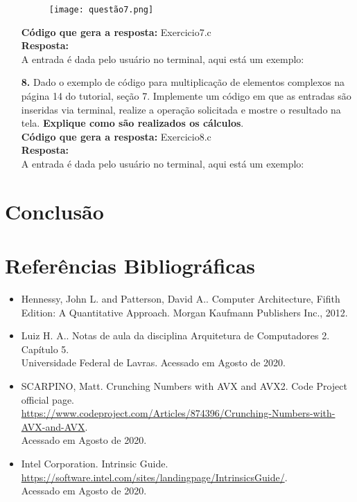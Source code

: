 \documentclass[oneside,a4paper,12pt]{article}
\renewcommand{\b}{\textbf}
\begin{document}
\begin{enumerate}
    \begin{figure}[H]
    \centering
    \texttt{[image: questão7.png]}
    \label{fig:Figura1}
    \end{figure}
   
   \b{Código que gera a resposta:} Exercicio7.c\\
   \b{Resposta:}\\
    A entrada é dada pelo usuário no terminal, aqui está um exemplo:\\
   
   \item[\b{8.}] Dado o exemplo de código para multiplicação de elementos complexos na página 14 do tutorial, seção 7. Implemente um código em que as entradas são inseridas via terminal, realize a operação solicitada e mostre o resultado na tela. \b{Explique como são realizados os cálculos}.\\
   
   \b{Código que gera a resposta:} Exercicio8.c\\
   \b{Resposta:}\\
    A entrada é dada pelo usuário no terminal, aqui está um exemplo:\\
   
\end{enumerate}

\section{Conclusão}
\onehalfspacing


\section{Referências Bibliográficas}

\begin{itemize}
    \item Hennessy, John L. and Patterson, David A.. Computer Architecture, Fifith Edition: A Quantitative Approach. Morgan Kaufmann Publishers Inc., 2012.
    
    \item Luiz H. A.. Notas de aula da disciplina Arquitetura de Computadores 2. Capítulo 5.\\
    Universidade Federal de Lavras. Acessado em Agosto de 2020.

    \item SCARPINO, Matt. Crunching Numbers with AVX and AVX2. Code Project official page.\\
    \url{https://www.codeproject.com/Articles/874396/Crunching-Numbers-with-AVX-and-AVX}.\\
    Acessado em Agosto de 2020.

    \item Intel Corporation. Intrinsic Guide.\\
    \url{https://software.intel.com/sites/landingpage/IntrinsicsGuide/}. \\
    Acessado em Agosto de 2020.

\end{itemize}
\end{document}
